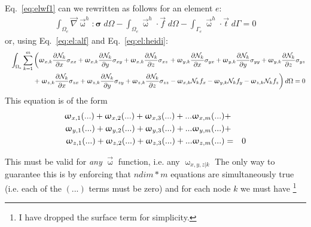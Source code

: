 Eq.~\eqref{eq:elwf1} can we rewritten as follows for an element $e$:
\begin{eqnarray}
\int_{\Omega_e} \vec\nabla \vec{\upomega}^h : {\bm \sigma} \; d\Omega
- \int_{\Omega_e} \vec\upomega^h \cdot \vec{f} \; d\Omega 
- \int_{\Gamma_e} \vec\upomega^h \cdot \vec{t} \; d\Gamma = 0
\end{eqnarray}
or, using Eq.~\eqref{eq:el:alf} and Eq.~\eqref{eq:el:heidi}:
\begin{eqnarray}
&&\int_{\Omega_e} \sum_{k=1}^m  
\left(
{\upomega}_{x,k} \frac{\partial {{\mathcal{N}}}_k}{\partial x} \sigma_{xx} +
{\upomega}_{x,k} \frac{\partial {{\mathcal{N}}}_k}{\partial y} \sigma_{xy} +
{\upomega}_{x,k} \frac{\partial {{\mathcal{N}}}_k}{\partial z} \sigma_{xz} 
\right. 
+
{\upomega}_{y,k} \frac{\partial {{\mathcal{N}}}_k}{\partial x} \sigma_{yx} +
{\upomega}_{y,k} \frac{\partial {{\mathcal{N}}}_k}{\partial y} \sigma_{yy} +
{\upomega}_{y,k} \frac{\partial {{\mathcal{N}}}_k}{\partial z} \sigma_{yz} \nonumber\\
&&+
\left.
{\upomega}_{z,k} \frac{\partial {{\mathcal{N}}}_k}{\partial x} \sigma_{zx} +
{\upomega}_{z,k} \frac{\partial {{\mathcal{N}}}_k}{\partial y} \sigma_{zy} +
{\upomega}_{z,k} \frac{\partial {{\mathcal{N}}}_k}{\partial z} \sigma_{zz} 
-{\upomega}_{x,k}  {{\mathcal{N}}}_k  f_x 
-{\upomega}_{y,k}  {{\mathcal{N}}}_k  f_y 
-{\upomega}_{z,k}  {{\mathcal{N}}}_k  f_z 
\right) d\Omega = 0 \nonumber
\end{eqnarray}
This equation is of the form 
\begin{eqnarray}
\upomega_{x,1} (...) + 
\upomega_{x,2} (...) + 
\upomega_{x,3} (...) + 
...
\upomega_{x,m} (...) &+&\nonumber\\ 
\upomega_{y,1} (...) + 
\upomega_{y,2} (...) + 
\upomega_{y,3} (...) + 
...
\upomega_{y,m} (...) &+&\nonumber\\
\upomega_{z,1} (...) + 
\upomega_{z,2} (...) + 
\upomega_{z,3} (...) + 
...
\upomega_{z,m} (...) &=&0
\end{eqnarray}

This must be valid for {\sl any} $\vec{\upomega}$ function, i.e. any $\upomega_{x,y,z|k}$
The only way to guarantee this is by enforcing that $ndim*m$ equations are simultaneously true
(i.e. each of the $(...)$ terms must be zero) and for each node $k$ we must have 
\footnote{I have dropped the surface term for simplicity.}

